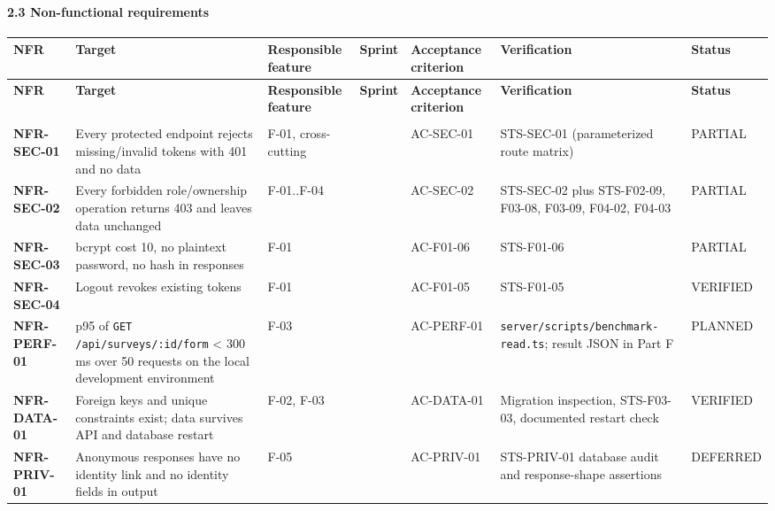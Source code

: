 \documentclass[12pt,a4paper]{article}
\begin{document}
\paragraph*{2.3 Non-functional requirements}
{\setlength{\tabcolsep}{3pt}\renewcommand{\arraystretch}{1.08}\scriptsize
\begin{longtable}{@{}>{\raggedright\arraybackslash}p{}>{\raggedright\arraybackslash}p{}>{\raggedright\arraybackslash}p{}>{\raggedright\arraybackslash}p{}>{\raggedright\arraybackslash}p{}>{\raggedright\arraybackslash}p{}>{\raggedright\arraybackslash}p{}@{}}
\toprule
\textbf{NFR} & \textbf{Target} & \textbf{Responsible feature} & \textbf{Sprint} & \textbf{Acceptance criterion} & \textbf{Verification} & \textbf{Status} \\
\midrule
\endfirsthead
\toprule
\textbf{NFR} & \textbf{Target} & \textbf{Responsible feature} & \textbf{Sprint} & \textbf{Acceptance criterion} & \textbf{Verification} & \textbf{Status} \\
\midrule
\endhead
\midrule
\multicolumn{7}{r}{\footnotesize\textit{Continued on next page}}\\
\endfoot
\bottomrule
\endlastfoot
\textbf{NFR-SEC-01} & Every protected endpoint rejects missing/invalid tokens with 401 and no data & F-01, cross-cutting & 1 & AC-SEC-01 & STS-SEC-01 (parameterized route matrix) & PARTIAL \\
\textbf{NFR-SEC-02} & Every forbidden role/ownership operation returns 403 and leaves data unchanged & F-01..F-04 & 1 & AC-SEC-02 & STS-SEC-02 plus STS-F02-09, F03-08, F03-09, F04-02, F04-03 & PARTIAL \\
\textbf{NFR-SEC-03} & bcrypt cost 10, no plaintext password, no hash in responses & F-01 & 1 & AC-F01-06 & STS-F01-06 & PARTIAL \\
\textbf{NFR-SEC-04} & Logout revokes existing tokens & F-01 & 1 & AC-F01-05 & STS-F01-05 & VERIFIED \\
\textbf{NFR-PERF-01} & p95 of \texttt{GET /api/surveys/:id/form} < 300 ms over 50 requests on the local development environment & F-03 & 1 & AC-PERF-01 & \texttt{server/scripts/benchmark-read.ts}; result JSON in Part F & PLANNED \\
\textbf{NFR-DATA-01} & Foreign keys and unique constraints exist; data survives API and database restart & F-02, F-03 & 1 & AC-DATA-01 & Migration inspection, STS-F03-03, documented restart check & VERIFIED \\
\textbf{NFR-PRIV-01} & Anonymous responses have no identity link and no identity fields in output & F-05 & 2 & AC-PRIV-01 & STS-PRIV-01 database audit and response-shape assertions & DEFERRED \\
\end{longtable}}
\end{document}
